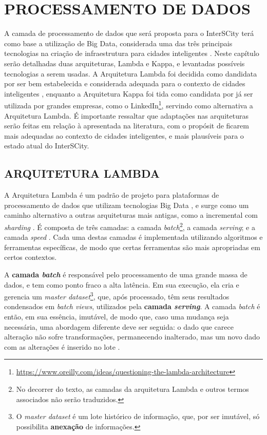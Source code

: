 \chapter[PROCESSAMENTO DE DADOS]{PROCESSAMENTO DE DADOS}
\label{chapter:data}

A camada de processamento de dados que será proposta para o InterSCity terá
como base a utilização de Big Data, considerada uma das três principais
tecnologias na criação de infraestrutura para cidades inteligentes
\cite{kon2016}. Neste capítulo serão detalhadas duas arquiteturas, Lambda e
Kappa, e levantadas possíveis tecnologias a serem usadas. A Arquitetura Lambda
foi decidida como dandidata por ser bem estabelecida e considerada adequada
para o contexto de cidades inteligentes \cite{kiran2015}, enquanto a
Arquitetura Kappa foi tida como candidata por já ser utilizada por grandes
empresas, como o
LinkedIn\footnote{\url{https://www.oreilly.com/ideas/questioning-the-lambda-architecture}},
servindo como alternativa a Arquitetura Lambda.
É importante ressaltar que adaptações nas arquiteturas serão feitas em
relação à apresentada na literatura, com o propósit de ficarem  mais adequadas
ao contexto de cidades inteligentes, e mais plausíveis para o estado atual do
InterSCity.

\section{ARQUITETURA LAMBDA}

A Arquitetura Lambda é um padrão de projeto para plataformas de processamento
de dados que utilizam tecnologias Big Data \cite{kiran2015}, e surge como um
caminho alternativo a outras arquiteturas mais antigas, como a incremental com
\textit{sharding} \cite{marz2015}. É composta de três camadas: a camada
\textit{batch}\footnote{No decorrer do texto, as camadas da arquitetura Lambda
e outros termos associados não serão traduzidos.}, a camada \textit{serving}; e
a camada \textit{speed} \cite{kiran2015}. Cada uma destas camadas é
implementada utilizando algoritmos e ferramentas específicas, de modo
que certas ferramentas são mais apropriadas em certos contextos.

A \textbf{camada \textit{batch}} é responsável pelo processamento de uma grande
massa de dados, e tem como ponto fraco a alta latência. Em sua execução, ela
cria e gerencia um \textit{master dataset}\footnote{O \textit{master dataset} é um lote
histórico de informação, que, por ser imutável, só possibilita \textbf{anexação}
de informações.}, que, após processado, têm seus resultados condensados em
\textit{batch views}, utilizados pela \textbf{camada \textit{serving}}.
A camada \textit{batch} é então, em sua essência, imutável, de modo que, caso
uma mudança seja necessária, uma abordagem diferente deve ser seguida: o dado
que carece alteração não sofre transformações, permanecendo inalterado, mas um
novo dado com as alterações é inserido no lote \cite{marz2015}.

